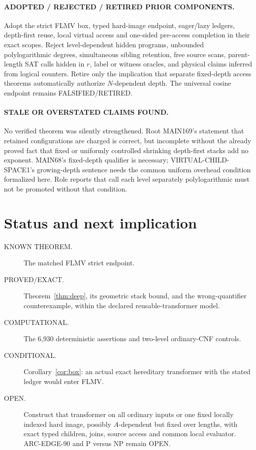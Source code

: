 \documentclass[11pt]{article}
\begin{document}
\paragraph{ADOPTED / REJECTED / RETIRED PRIOR COMPONENTS.}
Adopt the strict FLMV box, typed hard-image endpoint, eager/lazy ledgers,
depth-first reuse, local virtual access and one-sided pre-access completion in
their exact scopes.  Reject level-dependent hidden programs, unbounded
polylogarithmic degrees, simultaneous sibling retention, free source scans,
parent-length SAT calls hidden in $r$, label or witness oracles, and physical
claims inferred from logical counters.  Retire only the implication that
separate fixed-depth access theorems automatically authorize $N$-dependent
depth.  The universal cosine endpoint remains FALSIFIED/RETIRED.

\paragraph{STALE OR OVERSTATED CLAIMS FOUND.}
No verified theorem was silently strengthened.  Root MAIN169's statement
that retained configurations are charged is correct, but incomplete without
the already proved fact that fixed or uniformly controlled shrinking
depth-first stacks add no exponent.  MAIN68's fixed-depth qualifier is
necessary; VIRTUAL-CHILD-SPACE1's growing-depth sentence needs the common
uniform overhead condition formalized here.  Role reports that call each
level separately polylogarithmic must not be promoted without that condition.

\section{Status and next implication}
\begin{description}
\item[KNOWN THEOREM.] The matched FLMV strict endpoint.
\item[PROVED/EXACT.] Theorem~\ref{thm:deep}, its geometric stack bound, and
the wrong-quantifier counterexample, within the declared reusable-transformer
model.
\item[COMPUTATIONAL.] The 6,930 deterministic assertions and two-level
ordinary-CNF controls.
\item[CONDITIONAL.] Corollary~\ref{cor:box}: an actual exact hereditary
transformer with the stated ledger would enter FLMV.
\item[OPEN.] Construct that transformer on all ordinary inputs or one fixed
locally indexed hard image, possibly $A$-dependent but fixed over lengths,
with exact typed children, joins, source access and common local evaluator.
ARC-EDGE-90 and P versus NP remain OPEN.
\end{description}
\end{document}
